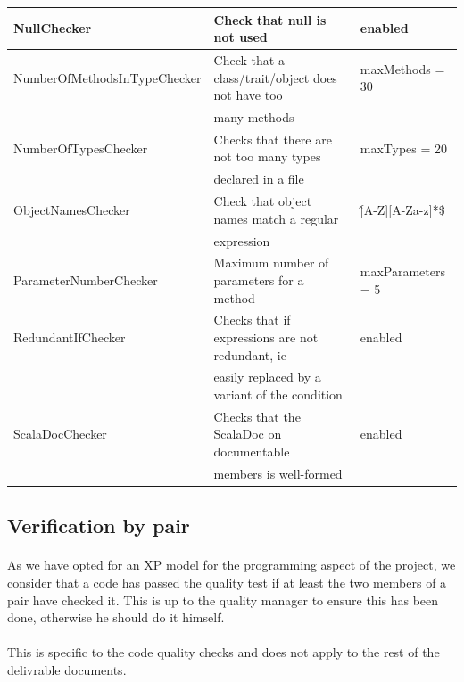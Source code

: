 \documentclass{report}
\begin{document}
\begin{center}
\begin{longtable}{|l|l|l|}
\hline
NullChecker & \small{Check that null is not used} & enabled \\
\hline
\small{NumberOfMethodsInTypeChecker} & \small{Check that a class/trait/object does not have too} & maxMethods = 30 \\
& \small{many methods} & \\
\hline
NumberOfTypesChecker & \small{Checks that there are not too many types} & maxTypes = 20 \\
& \small{declared in a file} & \\
\hline
ObjectNamesChecker & \small{Check that object names match a regular}  & \^[A-Z][A-Za-z]*\$ \\
& \small{expression} & \\
\hline
ParameterNumberChecker & \small{Maximum number of parameters for a method} & maxParameters = 5 \\
\hline
RedundantIfChecker & \small{Checks that if expressions are not redundant, ie} & enabled \\
& \small{easily replaced by a variant of the condition} &  \\
\hline
ScalaDocChecker & \small{Checks that the ScalaDoc on documentable}  & enabled \\
& \small{members is well-formed} & \\
\hline
\end{longtable} 
\end{center}
\renewcommand{\arraystretch}{1}
\subsection{Verification by pair}

\paragraph{}
\hspace{4mm}As we have opted for an XP model for the programming aspect of the project,
we consider that a code has passed the quality test if at least the two members of a pair
have checked it. This is up to the quality manager to ensure this has been done, otherwise he
should do it himself.

\paragraph{}
\hspace{4mm}This is specific to the code quality checks and does not apply to the rest of the delivrable documents.
\end{document}
